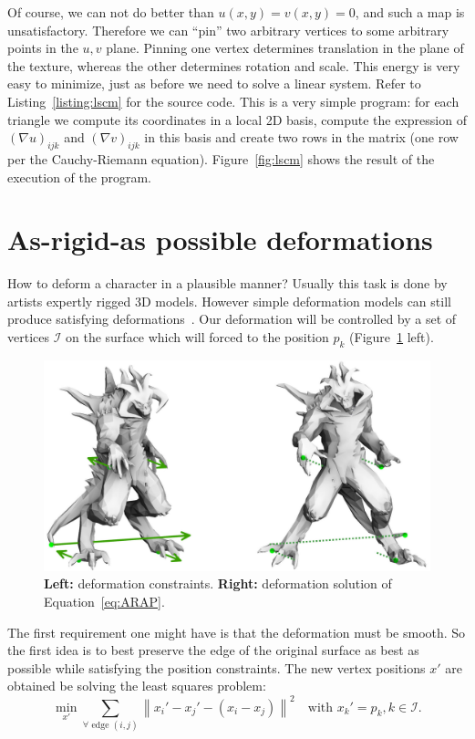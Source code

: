 \documentclass[notitlepage,oneside]{book}
\begin{document}
Of course, we can not do better than $u(x,y)=v(x,y)=0$, and such a map is unsatisfactory. Therefore we can ``pin'' two arbitrary vertices to some arbitrary points in the $u,v$ plane.
Pinning one vertex determines translation in the plane of the texture, whereas the other determines rotation and scale.
This energy is very easy to minimize, just as before we need to solve a linear system.
Refer to Listing~\ref{listing:lscm} for the source code.
This is a very simple program: for each triangle we compute its coordinates in a local 2D basis, compute the expression of $(\nabla u)_{ijk}$ and $(\nabla v)_{ijk}$ in this basis
and create two rows in the matrix (one row per the Cauchy-Riemann equation).
Figure~\ref{fig:lscm} shows the result of the execution of the program.


\section{As-rigid-as possible deformations}
\label{sec:arap}
How to deform a character in a plausible manner?
Usually this task is done by artists expertly rigged 3D models.
However simple deformation models can still produce satisfying deformations~\cite{ARAP_modeling:2007}.
Our deformation will be controlled by a set of vertices $\mathcal{I}$ on the surface which will forced to the position $p_k$ (Figure~\ref{fig:ARAP} left).

\begin{figure}[!h]
 \centering
 \includegraphics[width=\linewidth]{img/ARAP.jpg}
 \caption{\textbf{Left:} deformation constraints. \textbf{Right:} deformation solution of Equation~\eqref{eq:ARAP}.}
 \label{fig:ARAP}
\end{figure}

The first requirement one might have is that the deformation must be smooth. So the first idea is to best preserve the edge of the original surface as best as possible while satisfying the position constraints. The new vertex positions $x'$ are obtained be solving the least squares problem:
\begin{equation}
 \min_{x'} \sum_{\forall \text{ edge } (i,j)} \left\| x_i' - x_j'- (x_i - x_j) \right\|^2 \quad \text{with } x_k' = p_k , k \in \mathcal{I} .
\label{eq:ARAP_lap}
\end{equation}
\end{document}

